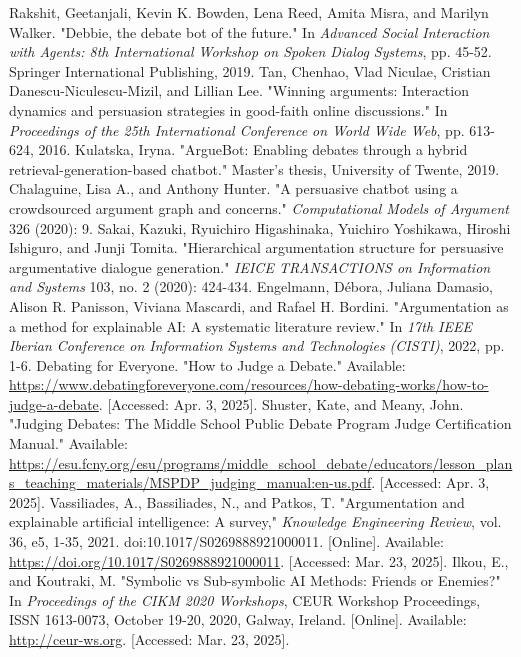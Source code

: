\documentclass[conference]{IEEEtran}
\begin{document}
\begin{thebibliography}{00}
     Rakshit, Geetanjali, Kevin K. Bowden, Lena Reed, Amita Misra, and Marilyn Walker. "Debbie, the debate bot of the future." In \textit{Advanced Social Interaction with Agents: 8th International Workshop on Spoken Dialog Systems}, pp. 45-52. Springer International Publishing, 2019.
     Tan, Chenhao, Vlad Niculae, Cristian Danescu-Niculescu-Mizil, and Lillian Lee. "Winning arguments: Interaction dynamics and persuasion strategies in good-faith online discussions." In \textit{Proceedings of the 25th International Conference on World Wide Web}, pp. 613-624, 2016.
     Kulatska, Iryna. "ArgueBot: Enabling debates through a hybrid retrieval-generation-based chatbot." Master's thesis, University of Twente, 2019.
     Chalaguine, Lisa A., and Anthony Hunter. "A persuasive chatbot using a crowdsourced argument graph and concerns." \textit{Computational Models of Argument} 326 (2020): 9.
     Sakai, Kazuki, Ryuichiro Higashinaka, Yuichiro Yoshikawa, Hiroshi Ishiguro, and Junji Tomita. "Hierarchical argumentation structure for persuasive argumentative dialogue generation." \textit{IEICE TRANSACTIONS on Information and Systems} 103, no. 2 (2020): 424-434.
     Engelmann, Débora, Juliana Damasio, Alison R. Panisson, Viviana Mascardi, and Rafael H. Bordini. "Argumentation as a method for explainable AI: A systematic literature review." In \textit{17th IEEE Iberian Conference on Information Systems and Technologies (CISTI)}, 2022, pp. 1-6.
     Debating for Everyone. "How to Judge a Debate." Available: \url{https://www.debatingforeveryone.com/resources/how-debating-works/how-to-judge-a-debate}. [Accessed: Apr. 3, 2025].
     Shuster, Kate, and Meany, John. "Judging Debates: The Middle School Public Debate Program Judge Certification Manual." Available: \url{https://esu.fcny.org/esu/programs/middle_school_debate/educators/lesson_plans_teaching_materials/MSPDP_judging_manual:en-us.pdf}. [Accessed: Apr. 3, 2025].
     Vassiliades, A., Bassiliades, N., and Patkos, T. "Argumentation and explainable artificial intelligence: A survey," \textit{Knowledge Engineering Review}, vol. 36, e5, 1-35, 2021. doi:10.1017/S0269888921000011. [Online]. Available: \url{https://doi.org/10.1017/S0269888921000011}. [Accessed: Mar. 23, 2025].
     Ilkou, E., and Koutraki, M. "Symbolic vs Sub-symbolic AI Methods: Friends or Enemies?" In \textit{Proceedings of the CIKM 2020 Workshops}, CEUR Workshop Proceedings, ISSN 1613-0073, October 19-20, 2020, Galway, Ireland. [Online]. Available: \url{http://ceur-ws.org}. [Accessed: Mar. 23, 2025].

\end{thebibliography}
\end{document}
